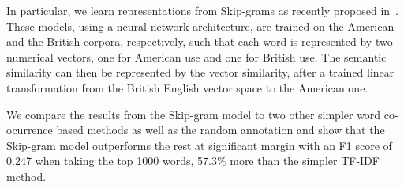 In particular, we learn representations from Skip-grams
as recently proposed in~\cite{Mikolov2013distributed}.
These models, using a neural network architecture,
are trained on the American and the British corpora, respectively,
such that each word is represented by two numerical vectors, one for
American use and one for British use. The semantic similarity can then
be represented by the vector similarity, after a trained linear transformation
\cite{Mikolov:2013tp} from the British English vector space
to the American one.

We compare the results from the Skip-gram model to two other simpler
word co-ocurrence based methods as well as the random annotation and show
that the Skip-gram model outperforms the rest at significant margin
with an F1 score of 0.247 when taking the top 1000 words, 57.3\% more than
the simpler TF-IDF method.



